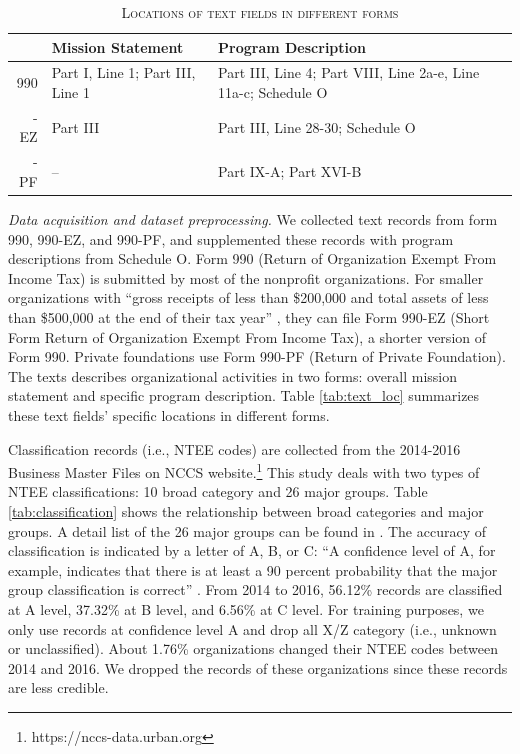 \documentclass[11pt]{article}
\begin{document}

\begin{table}[]
    \centering
    \begin{tabularx}{\textwidth}{r|X|X}
    	 \hline
         & Mission Statement & Program Description \\
         \hline
         990 & Part I, Line 1; Part III, Line 1 & Part III, Line 4; Part VIII, Line 2a-e, Line 11a-c; Schedule O \\
         \hdashline
         990-EZ & Part III & Part III, Line 28-30; Schedule O \\
         \hdashline
         990-PF & -- & Part IX-A; Part XVI-B \\
         \hline
    \end{tabularx}
    \caption{\textsc{Locations of text fields in different forms}} \label{tab:text_loc}
    \label{tab:my_label}
\end{table}

\textit{Data acquisition and dataset preprocessing.} We collected text records from form 990, 990-EZ, and 990-PF, and supplemented these records with program descriptions from Schedule O. Form 990 (Return of Organization Exempt From Income Tax) is submitted by most of the nonprofit organizations. For smaller organizations with ``gross receipts of less than \$200,000 and total assets of less than \$500,000 at the end of their tax year'' \parencite[1]{USInternalRevenueService2017InstructionsForm2018}, they can file Form 990-EZ (Short Form Return of Organization Exempt From Income Tax), a shorter version of Form 990. Private foundations use Form 990-PF (Return of Private Foundation). The texts describes organizational activities in two forms: overall mission statement and specific program description. Table \ref{tab:text_loc} summarizes these text fields' specific locations in different forms.

Classification records (i.e., NTEE codes) are collected from the 2014-2016 Business Master Files on NCCS website.\footnote{https://nccs-data.urban.org} This study deals with two types of NTEE classifications: 10 broad category and 26 major groups. Table \ref{tab:classification} shows the relationship between broad categories and major groups. A detail list of the 26 major groups can be found in \textcite{USInternalRevenueServiceExemptOrganizationsBusiness2014}. The accuracy of classification is indicated by a letter of A, B, or C: ``A confidence level of A, for example, indicates that there is at least a 90 percent probability that the major group classification is correct'' \parencite[16]{NationalCenterforCharitableStatisticsGuideUsingNCCS2006}. From 2014 to 2016, 56.12\% records are classified at A level, 37.32\% at B level, and 6.56\% at C level. For training purposes, we only use records at confidence level A and drop all X/Z category (i.e., unknown or unclassified). About 1.76\% organizations changed their NTEE codes between 2014 and 2016. We dropped the records of these organizations since these records are less credible.
\end{document}
